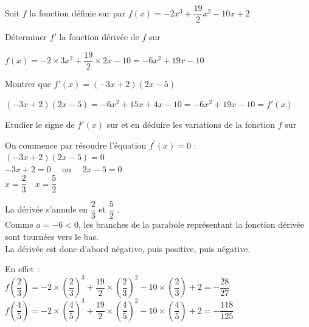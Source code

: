 \documentclass[12pt,a4paper]{book}
\begin{document}
Soit $f$ la fonction définie sur \R par $f(x)=-2x^3+\dfrac{19}{2}x^2-10x+2$
\begin{enumMet}
	\item Déterminer $f'$ la fonction dérivée de $f$ sur \R
	\begin{corrBox}
		$f(x)=-2\times 3x^2+\dfrac{19}{2}\times 2x-10=-6x^2+19x-10$
	\end{corrBox}
	\item Montrer que $f'(x)=(-3x+2)(2x-5)$
	\begin{corrBox}
		$(-3x+2)(2x-5)=-6x^2+15x+4x-10=-6x^2+19x-10=f'(x)$
	\end{corrBox}
	\item Etudier le signe de $f'(x)$ sur \R et en déduire les variations de la fonction $f$ sur \R
	\begin{corrBox}
		On commence par résoudre l'équation $f^{\prime}(x)=0$ :\\
		$(-3x+2)(2x-5)=0$\\
		$-3x+2=0 \quad$ ou $\quad 2x-5=0$\\
		$x=\dfrac{2}{3} \quad x=\dfrac{5}{2}$
		
		La dérivée s'annule en $\dfrac{2}{3}$ et $\dfrac{5}{2}$ .\\
		Comme $a=-6<0$, les branches de la parabole représentant la fonction dérivée sont tournées vers le bas.\\
		La dérivée est donc d'abord négative, puis positive, puis négative.\\
		\begin{center}
		\end{center}
		En effet :\\
		$f(\dfrac{2}{3})=-2\times (\dfrac{2}{3})^{3}+\dfrac{19}{2} \times(\dfrac{2}{3})^{2}-10 \times(\dfrac{2}{3})+2=-\dfrac{28}{27}$\\
		$f(\dfrac{4}{5})=-2\times (\dfrac{4}{5})^{3}+\dfrac{19}{2} \times(\dfrac{4}{5})^{2}-10 \times(\dfrac{4}{5})+2=-\dfrac{118}{125}$		
	\end{corrBox}
\end{enumMet}
\end{document}
